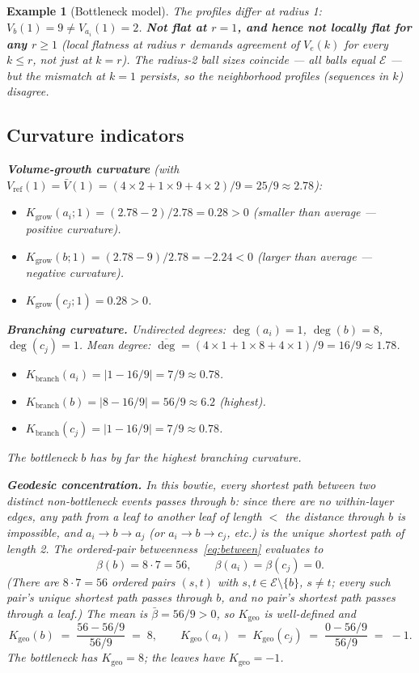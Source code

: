 \documentclass[12pt]{article}
\newtheorem{example}[theorem]{Example}
\newcommand{\Ecal}{\mathcal{E}}
\begin{document}
\begin{example}[Bottleneck model]
The profiles differ at radius 1: $V_b(1) = 9 \neq V_{a_i}(1) = 2$. \textbf{Not flat at $r = 1$, and hence not locally flat for any $r \geq 1$} (local flatness at radius $r$ demands agreement of $V_e(k)$ for every $k \leq r$, not just at $k = r$). The radius-2 ball sizes coincide --- all balls equal $\Ecal$ --- but the mismatch at $k = 1$ persists, so the neighborhood profiles (sequences in $k$) disagree.

\subsection*{Curvature indicators}

\textbf{Volume-growth curvature} (with $V_{\mathrm{ref}}(1) = \bar{V}(1) = (4 \times 2 + 1 \times 9 + 4 \times 2)/9 = 25/9 \approx 2.78$):
\begin{itemize}
    \item $K_{\mathrm{grow}}(a_i; 1) = (2.78 - 2)/2.78 = 0.28 > 0$ (smaller than average --- positive curvature).
    \item $K_{\mathrm{grow}}(b; 1) = (2.78 - 9)/2.78 = -2.24 < 0$ (larger than average --- negative curvature).
    \item $K_{\mathrm{grow}}(c_j; 1) = 0.28 > 0$.
\end{itemize}

\textbf{Branching curvature.} Undirected degrees: $\deg(a_i) = 1$, $\deg(b) = 8$, $\deg(c_j) = 1$. Mean degree: $\overline{\deg} = (4 \times 1 + 1 \times 8 + 4 \times 1)/9 = 16/9 \approx 1.78$.
\begin{itemize}
    \item $K_{\mathrm{branch}}(a_i) = |1 - 16/9| = 7/9 \approx 0.78$.
    \item $K_{\mathrm{branch}}(b) = |8 - 16/9| = 56/9 \approx 6.2$ (highest).
    \item $K_{\mathrm{branch}}(c_j) = |1 - 16/9| = 7/9 \approx 0.78$.
\end{itemize}

The bottleneck $b$ has by far the highest branching curvature.

\textbf{Geodesic concentration.} In this bowtie, every shortest path between two distinct non-bottleneck events passes through $b$: since there are no within-layer edges, any path from a leaf to another leaf of length $<$ the distance through $b$ is impossible, and $a_i \to b \to a_j$ (or $a_i \to b \to c_j$, etc.) is the unique shortest path of length 2. The ordered-pair betweenness~\eqref{eq:between} evaluates to
\[
    \beta(b) = 8 \cdot 7 = 56, \qquad \beta(a_i) = \beta(c_j) = 0.
\]
(There are $8 \cdot 7 = 56$ ordered pairs $(s,t)$ with $s,t \in \Ecal\setminus\{b\}$, $s \neq t$; every such pair's unique shortest path passes through $b$, and no pair's shortest path passes through a leaf.) The mean is $\bar\beta = 56/9 > 0$, so $K_{\mathrm{geo}}$ is well-defined and
\begin{equation}
    K_{\mathrm{geo}}(b) \;=\; \frac{56 - 56/9}{56/9} \;=\; 8, \qquad K_{\mathrm{geo}}(a_i) \;=\; K_{\mathrm{geo}}(c_j) \;=\; \frac{0 - 56/9}{56/9} \;=\; -1.
\end{equation}
The bottleneck has $K_{\mathrm{geo}} = 8$; the leaves have $K_{\mathrm{geo}} = -1$.


\end{example}
\end{document}

